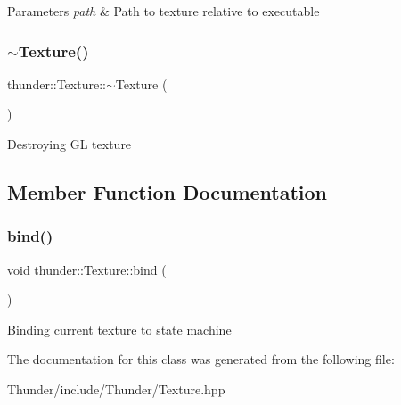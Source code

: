 \begin{DoxyParams}{Parameters}
{\em path} & Path to texture relative to executable \\
\hline
\end{DoxyParams}
\mbox{\label{classthunder_1_1_texture_ad24149a27adb027ff78462fb492b5f35}} 
\subsubsection{\texorpdfstring{$\sim$\+Texture()}{~Texture()}}
{\footnotesize\ttfamily thunder\+::\+Texture\+::$\sim$\+Texture (\begin{DoxyParamCaption}{ }\end{DoxyParamCaption})}

Destroying GL texture 

\subsection{Member Function Documentation}
\mbox{\label{classthunder_1_1_texture_a3159825482c30bb34054734ddb48b526}} 
\subsubsection{\texorpdfstring{bind()}{bind()}}
{\footnotesize\ttfamily void thunder\+::\+Texture\+::bind (\begin{DoxyParamCaption}{ }\end{DoxyParamCaption})}

Binding current texture to state machine 

The documentation for this class was generated from the following file\+:\begin{DoxyCompactItemize}
\item 
Thunder/include/\+Thunder/Texture.\+hpp\end{DoxyCompactItemize}
